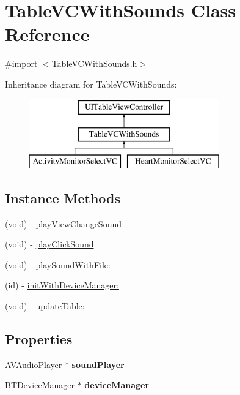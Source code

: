 \hypertarget{interface_table_v_c_with_sounds}{\section{Table\-V\-C\-With\-Sounds Class Reference}
\label{interface_table_v_c_with_sounds}
}


{\ttfamily \#import $<$Table\-V\-C\-With\-Sounds.\-h$>$}

Inheritance diagram for Table\-V\-C\-With\-Sounds\-:\begin{figure}[H]
\begin{center}
\leavevmode
\includegraphics[height=3.000000cm]{interface_table_v_c_with_sounds}
\end{center}
\end{figure}
\subsection*{Instance Methods}
\begin{DoxyCompactItemize}
\item 
(void) -\/ \hyperlink{interface_table_v_c_with_sounds_ad6f4138cb1ce20398ff2b004a1d72143}{play\-View\-Change\-Sound}
\item 
(void) -\/ \hyperlink{interface_table_v_c_with_sounds_abca3853865cb3bc0baf5a12b6f6e3a47}{play\-Click\-Sound}
\item 
(void) -\/ \hyperlink{interface_table_v_c_with_sounds_ab472120173deceba269ec2acd946bbf7}{play\-Sound\-With\-File\-:}
\item 
(id) -\/ \hyperlink{interface_table_v_c_with_sounds_adc0912c1502c5b3e18871081eb87e732}{init\-With\-Device\-Manager\-:}
\item 
(void) -\/ \hyperlink{interface_table_v_c_with_sounds_a95ae2a39d8d064c192e3d608dbc8f275}{update\-Table\-:}
\end{DoxyCompactItemize}
\subsection*{Properties}
\begin{DoxyCompactItemize}
\item 
\hypertarget{interface_table_v_c_with_sounds_a1d5a3b65dc2d25613e6b3ee5e3eeec22}{A\-V\-Audio\-Player $\ast$ {\bfseries sound\-Player}}\label{interface_table_v_c_with_sounds_a1d5a3b65dc2d25613e6b3ee5e3eeec22}

\item 
\hypertarget{interface_table_v_c_with_sounds_a54320e7404010ce9fcdc14ec1f065091}{\hyperlink{interface_b_t_device_manager}{B\-T\-Device\-Manager} $\ast$ {\bfseries device\-Manager}}\label{interface_table_v_c_with_sounds_a54320e7404010ce9fcdc14ec1f065091}

\end{DoxyCompactItemize}


